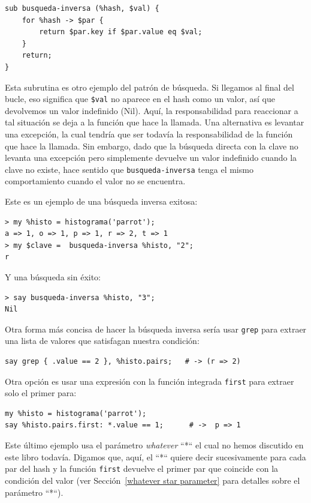 \begin{lstlisting}
sub busqueda-inversa (%hash, $val) { 
    for %hash -> $par { 
        return $par.key if $par.value eq $val;
    }
    return;
}
\end{lstlisting}
%
Esta subrutina es otro ejemplo del patrón de búsqueda. 
Si llegamos al final del bucle, eso significa que \verb|$val|
no aparece en el hash como un valor, así que devolvemos un 
valor indefinido (Nil). Aquí, la responsabilidad para reaccionar
a tal situación se deja a la función que hace la llamada. 
Una alternativa es levantar una excepción, la cual tendría
que ser todavía la responsabilidad de la función que hace la
llamada. Sin embargo, dado que la búsqueda directa con la clave
no levanta una excepción pero simplemente devuelve un valor indefinido
cuando la clave no existe, hace sentido que {\tt busqueda-inversa}
tenga el mismo comportamiento cuando el valor no se encuentra.

Este es un ejemplo de una búsqueda inversa exitosa:

\begin{lstlisting}
> my %histo = histograma('parrot');
a => 1, o => 1, p => 1, r => 2, t => 1
> my $clave =  busqueda-inversa %histo, "2";
r
\end{lstlisting}
%
Y una búsqueda sin éxito:

\begin{lstlisting}
> say busqueda-inversa %histo, "3";
Nil
\end{lstlisting}
%

Otra forma más concisa de hacer la búsqueda inversa sería
usar {\tt grep} para extraer una lista de valores 
que satisfagan nuestra condición:
\begin{lstlisting}
say grep { .value == 2 }, %histo.pairs;   # -> (r => 2)
\end{lstlisting}

Otra opción es usar una expresión con la función integrada
{\tt first} para extraer solo el primer para:
\begin{lstlisting}
my %histo = histograma('parrot');
say %histo.pairs.first: *.value == 1;      # ->  p => 1
\end{lstlisting}

Este último ejemplo usa el parámetro \emph{whatever} ``*``
el cual no hemos discutido en este libro todavía. Digamos que,
aquí, el ``*`` quiere decir sucesivamente para cada par del hash
y la función {\tt first} devuelve el primer par que coincide
con la condición del valor (ver 
Sección~\ref{whatever star parameter} para detalles sobre
el parámetro ``*``).

